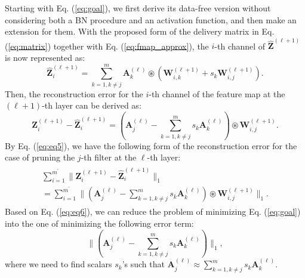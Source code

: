 Starting with Eq. (\ref{eq:goal}), we first derive its data-free version without considering both a BN procedure and an activation function, and then make an extension for them. With the proposed form of the delivery matrix in Eq. (\ref{eq:matrix}) together with Eq. (\ref{eq:fmap_approx}), the $i$-th channel of $\mathbf{\hat{Z}}^{{(\ell+1)}}$ is now represented as:
\begin{equation}
{{\mathbf{\hat{Z}}}_{i}^{{(\ell+1)}}} = \sum\limits_{k = 1, k \neq j}^{m} \mathbf{A}_{k}^{(\ell)} \circledast (\mathbf{W}_{i,k}^{(\ell+1)}+{s_{k}} \mathbf{W}_{i,j}^{(\ell+1)}).
\nonumber
\end{equation}
Then, the reconstruction error for the $i$-th channel of the feature map at the $(\ell+1)$-th layer can be derived as:
\begin{equation}
{\mathbf{Z}_{i}^{{(\ell+1)}}}-{\mathbf{\hat{Z}}_{i}^{{(\ell+1)}}}=(\mathbf{A}_{j}^{(\ell)}-\sum\limits_{k = 1, k \neq j}^{m}{s_{k}} \mathbf{A}_{k}^{(\ell)})\circledast \mathbf{W}_{i,j}^{(\ell+1)}.
\label{eq:eq5}
\end{equation}
By Eq. (\ref{eq:eq5}), we have the following form of the reconstruction error for the case of pruning the $j$-th filter at the $\ell$-th layer:
\begin{eqnarray}\begin{split}
\sum\limits_{{i} = 1}^{m^{\prime}}\|{\mathbf{Z}_{i}^{{(\ell+1)}}-\mathbf{\hat{Z}}_{i}^{{(\ell+1)}}}\|_1 ~~~~~~~~~~~~~~~~~\\ 
=\sum\limits_{{i} =  1}^{m^{\prime}}\|(\mathbf{A}_{j}^{(\ell)}-\sum\limits_{k = 1, k \neq j}^{m}{s_{k}} \mathbf{A}_{k}^{(\ell)})\circledast\mathbf{W}_{i,j}^{(\ell+1)}\|_1.
\end{split}
\label{eq:eq6}
\end{eqnarray}
Based on Eq. (\ref{eq:eq6}), we can reduce the problem of minimizing Eq. (\ref{eq:goal}) into the one of minimizing the following error term:
\begin{equation} \label{eq:goal2}
\|(\mathbf{A}_{j}^{(\ell)}-\sum\limits_{k = 1, k \neq j}^{m}{s_{k}} \mathbf{A}_{k}^{(\ell)})\|_1,
\end{equation}
where we need to find scalars $s_{k}$'s such that ${ \mathbf{A}_{j}^{(\ell)} \approx \sum\limits_{k = 1, k \neq j}^{m}{s_{k}} \mathbf{A}_{k}^{(\ell)}}$.

